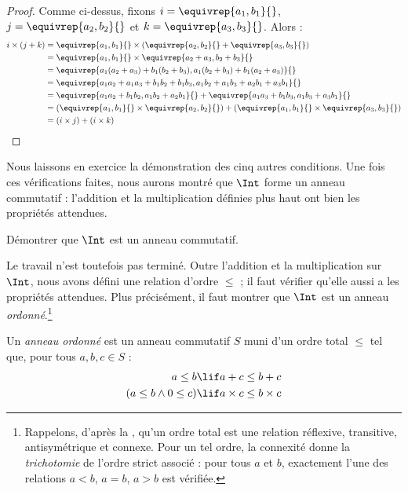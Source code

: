 \documentclass[../../../include/open-logic-section]{subfiles}
\begin{document}
\begin{proof}
Comme ci-dessus, fixons $i = \equivrep{a_1, b_1}{}$,
$j = \equivrep{a_2,b_2}{}$ et $k = \equivrep{a_3, b_3}{}$. Alors :
\begin{align*}
  i \times (j + k)
  &= \equivrep{a_1, b_1}{} \times (\equivrep{a_2,b_2}{} + \equivrep{a_3, b_3}{})\\
  &= \equivrep{a_1, b_1}{} \times \equivrep{a_2 + a_3,b_2+b_3}{}\\
  &= \equivrep{a_1 (a_2 + a_3) + b_1 (b_2+b_3), a_1 (b_2 + b_3) + b_1 (a_2 + a_3)}{}\\
  &= \equivrep{a_1 a_2 + a_1a_3 + b_1 b_2+b_1b_3, a_1 b_2 + a_1b_3 + a_2b_1 + a_3b_1}{}\\
  &= \equivrep{a_1a_2 + b_1b_2, a_1b_2 + a_2b_1}{} + \equivrep{a_1a_3 + b_1b_3, a_1b_3 + a_3b_1}{}\\
  &= (\equivrep{a_1, b_1}{} \times \equivrep{a_2,b_2}{}) + (\equivrep{a_1, b_1}{} \times \equivrep{a_3, b_3}{})\\
  &= (i \times j) + (i \times k)
\end{align*}
\end{proof}

Nous laissons en exercice la démonstration des cinq autres conditions.
Une fois ces vérifications faites, nous aurons montré que $\Int$ forme
un anneau commutatif : l'addition et la multiplication définies plus
haut ont bien les propriétés attendues.

\begin{prob}
Démontrer que $\Int$ est un anneau commutatif.
\end{prob}

Le travail n'est toutefois pas terminé. Outre l'addition et la
multiplication sur $\Int$, nous avons défini une relation d'ordre
$\leq$ ; il faut vérifier qu'elle aussi a les propriétés attendues.
Plus précisément, il faut montrer que $\Int$ est un anneau
\emph{ordonné}.\footnote{Rappelons, d'après la
, qu'un ordre total est une
relation réflexive, transitive, antisymétrique et connexe. Pour un tel
ordre, la connexité donne la \emph{trichotomie} de l'ordre strict
associé : pour tous $a$ et $b$, exactement l'une des relations
$a < b$, $a = b$, $a > b$ est vérifiée.}
%
%
%

\begin{defn}
Un \emph{anneau ordonné} est un anneau commutatif $S$ muni d’un
ordre total $\leq$ tel que, pour tous $a,b,c\in S$ :
\begin{align*}
  a \leq b &\lif a + c \leq b + c\\
  (a \leq b \land 0 \leq c) &\lif a \times c \leq b \times c
\end{align*}
\end{defn}
\end{document}
